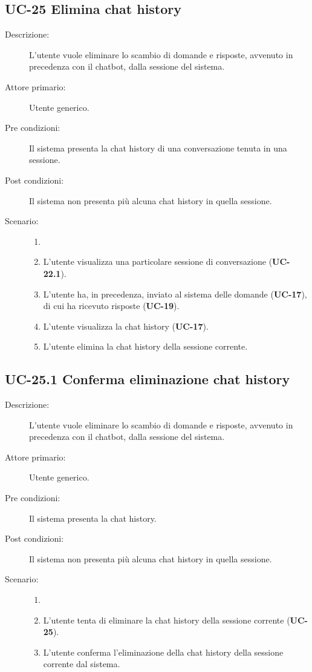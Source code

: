 \subsection{UC-25 Elimina chat history}
\begin{description}
    \item[Descrizione:] L'utente vuole eliminare lo scambio di domande e risposte, avvenuto in precedenza con il chatbot, dalla sessione del sistema.
    \item[Attore primario:] Utente generico.
    \item[Pre condizioni:] Il sistema presenta la chat history di una conversazione tenuta in una sessione.
    \item[Post condizioni:] Il sistema non presenta più alcuna chat history in quella sessione.
    \item[Scenario:]
    \begin{enumerate}
        \item[]
        \item L'utente visualizza una particolare sessione di conversazione (\textbf{UC-22.1}).
        \item L'utente ha, in precedenza, inviato al sistema delle domande (\textbf{UC-17}), di cui ha ricevuto risposte (\textbf{UC-19}).
        \item L'utente visualizza la chat history (\textbf{UC-17}).
        \item L'utente elimina la chat history della sessione corrente.
    \end{enumerate}
\end{description}

\subsection{UC-25.1 Conferma eliminazione chat history}
\begin{description}
    \item[Descrizione:] L'utente vuole eliminare lo scambio di domande e risposte, avvenuto in precedenza con il chatbot, dalla sessione del sistema.
    \item[Attore primario:] Utente generico.
    \item[Pre condizioni:] Il sistema presenta la chat history.
    \item[Post condizioni:] Il sistema non presenta più alcuna chat history in quella sessione.
    \item[Scenario:]
    \begin{enumerate}
        \item[]
        \item L'utente tenta di eliminare la chat history della sessione corrente (\textbf{UC-25}).
        \item L'utente conferma l'eliminazione della chat history della sessione corrente dal sistema.
    \end{enumerate}
\end{description}

